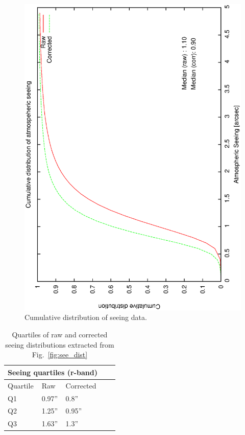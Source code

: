 {{\begin{figure}[htbp]
\begin{center}
    \includegraphics[scale=0.4, angle=-90]{figures/ecs/cum_seeing_dist.eps}
\end{center}  
\caption[Cumulative distribution of r-band seeing data.]
{Cumulative distribution of seeing data.}
\label{fig:see_cum_dist}
\end{figure}


\begin{table}[htbp]
\begin{center}
\begin{tabular}{lllll}
\toprule
\multicolumn{3}{c}{Seeing quartiles (r-band)} \\
\midrule
Quartile & Raw & Corrected \\
\midrule
Q1 & 0.97'' & 0.8''  \\
Q2 & 1.25'' & 0.95'' \\
Q3 & 1.63'' & 1.3''  \\
\bottomrule
\end{tabular}
\end{center}
\caption[Quartiles of raw and corrected seeing distributions]
{Quartiles of raw and corrected seeing distributions extracted from Fig.~\ref{fig:see_dist}}
\label{tab:seeing_quartiles}
\end{table}

}}
